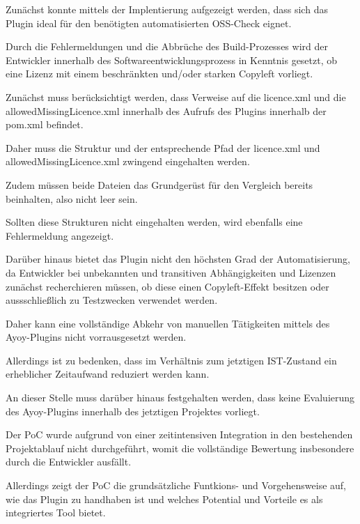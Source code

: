 Zunächst konnte mittels der Implentierung aufgezeigt werden, dass sich das Plugin ideal für den benötigten automatisierten OSS-Check eignet. 

Durch die Fehlermeldungen und die Abbrüche des Build-Prozesses wird der Entwickler innerhalb des Softwareentwicklungsprozess in Kenntnis gesetzt, ob eine Lizenz mit einem beschränkten und/oder starken Copyleft vorliegt.

Zunächst muss berücksichtigt werden, dass Verweise auf die licence.xml und die allowedMissingLicence.xml innerhalb des Aufrufs des Plugins innerhalb der pom.xml befindet. 

Daher muss die Struktur und der entsprechende Pfad der licence.xml und allowedMissingLicence.xml zwingend eingehalten werden.

Zudem müssen beide Dateien das Grundgerüst für den Vergleich bereits beinhalten, also nicht leer sein. 

Sollten diese Strukturen nicht eingehalten werden, wird ebenfalls eine Fehlermeldung angezeigt. 

Darüber hinaus bietet das Plugin nicht den höchsten Grad der Automatisierung, da Entwickler bei unbekannten und transitiven Abhängigkeiten und Lizenzen zunächst recherchieren müssen, ob diese einen Copyleft-Effekt besitzen oder aussschließlich zu Testzwecken verwendet werden.  

Daher kann eine vollständige Abkehr von manuellen Tätigkeiten mittels des Ayoy-Plugins nicht vorrausgesetzt werden.

Allerdings ist zu bedenken, dass im Verhältnis zum jetztigen IST-Zustand ein erheblicher Zeitaufwand reduziert werden kann. 

An dieser Stelle muss darüber hinaus festgehalten werden, dass keine Evaluierung des Ayoy-Plugins innerhalb des jetztigen Projektes vorliegt. 

Der PoC wurde aufgrund von einer zeitintensiven Integration in den bestehenden Projektablauf nicht durchgeführt, womit die vollständige Bewertung insbesondere durch die Entwickler ausfällt. 

Allerdings zeigt der PoC die grundsätzliche Funtkions- und Vorgehensweise auf, wie das Plugin zu handhaben ist und welches Potential und Vorteile es als integriertes Tool bietet.
 